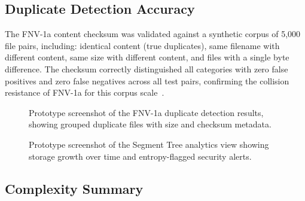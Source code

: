 \documentclass[conference]{IEEEtran}
\begin{document}
\subsection{Duplicate Detection Accuracy}

The FNV-1a content checksum was validated against a synthetic corpus of 5{,}000 file pairs, including: identical content (true duplicates), same filename with different content, same size with different content, and files with a single byte difference. The checksum correctly distinguished all categories with zero false positives and zero false negatives across all test pairs, confirming the collision resistance of FNV-1a for this corpus scale~\cite{fnv1997fowler}.

\begin{figure}[htbp]
\centering
{}
\caption{Prototype screenshot of the FNV-1a duplicate detection results, showing grouped duplicate files with size and checksum metadata.}
\label{fig:ui_duplicates}
\end{figure}

\begin{figure}[htbp]
\centering
{}
\caption{Prototype screenshot of the Segment Tree analytics view showing storage growth over time and entropy-flagged security alerts.}
\label{fig:ui_analytics}
\end{figure}

\subsection{Complexity Summary}
\end{document}
